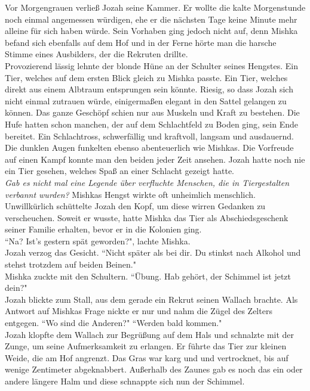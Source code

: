 Vor Morgengrauen verließ Jozah seine Kammer. Er wollte die kalte Morgenstunde noch einmal 
angemessen würdigen, ehe er die nächsten Tage keine Minute mehr alleine für sich haben würde. Sein 
Vorhaben ging jedoch nicht auf, denn Mishka befand sich ebenfalls auf dem Hof und in der Ferne 
hörte man die harsche Stimme eines Ausbilders, der die Rekruten drillte.\\
Provozierend lässig lehnte der blonde Hüne an der Schulter seines Hengstes. Ein Tier, welches auf 
dem ersten Blick gleich zu Mishka passte. Ein Tier, welches direkt aus einem Albtraum entsprungen 
sein könnte. Riesig, so dass Jozah sich nicht einmal zutrauen würde, einigermaßen elegant in den 
Sattel gelangen zu können. Das ganze Geschöpf schien nur aus Muskeln und Kraft zu bestehen. Die 
Hufe hatten schon manchen, der auf dem Schlachtfeld zu Boden ging, sein Ende bereitet. Ein 
Schlachtross, schwerfällig und kraftvoll, langsam und ausdauernd. Die dunklen Augen funkelten 
ebenso abenteuerlich wie Mishkas. Die Vorfreude auf einen Kampf konnte man den beiden jeder Zeit 
ansehen. Jozah hatte noch nie ein Tier gesehen, welches Spaß an einer Schlacht gezeigt hatte. \\
\textit{Gab es nicht mal eine Legende über verfluchte Menschen, die in Tiergestalten verbannt 
wurden?}
Mishkas Hengst wirkte oft unheimlich menschlich. Unwillkürlich schüttelte Jozah den Kopf, um diese 
wirren Gedanken zu verscheuchen. Soweit er wusste, hatte Mishka das Tier als Abschiedsgeschenk 
seiner Familie erhalten, bevor er in die Kolonien ging.\\
``Na? Ist's gestern spät geworden?", lachte Mishka.\\
Jozah verzog das Gesicht. ``Nicht später als bei dir. Du stinkst nach Alkohol und stehst trotzdem 
auf 
beiden Beinen."\\
Mishka zuckte mit den Schultern. ``Übung. Hab gehört, der Schimmel ist jetzt dein?"\\
Jozah blickte zum Stall, aus dem gerade ein Rekrut seinen Wallach brachte. Als Antwort auf Mishkas 
Frage nickte er nur und nahm die Zügel des Zelters entgegen. ``Wo sind die Anderen?"
``Werden bald kommen."\\
Jozah klopfte dem Wallach zur Begrüßung auf dem Hals und schnalzte mit der Zunge, um seine 
Aufmerksamkeit zu erlangen. Er führte das Tier zur kleinen Weide, die am Hof angrenzt. Das Gras war 
karg und und vertrocknet, bis auf wenige Zentimeter abgeknabbert. Außerhalb des Zaunes gab es noch 
das ein oder andere längere Halm und diese schnappte sich nun der Schimmel. 
